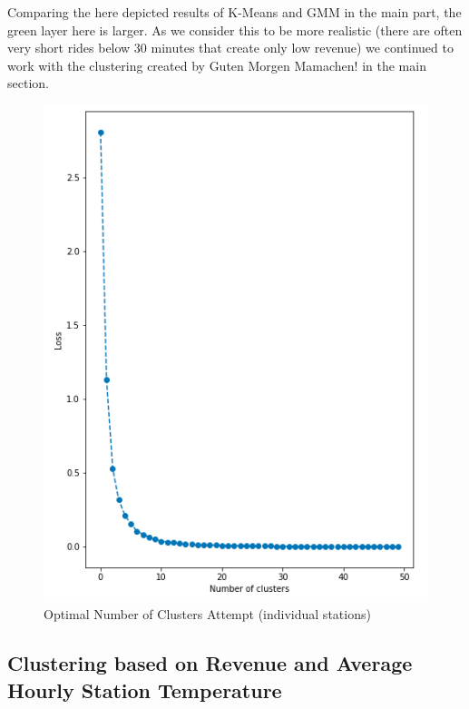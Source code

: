 Comparing the here depicted results of K-Means and GMM in the main part, the green layer here is larger. As we consider this to be more realistic (there are often very short rides below 30 minutes that create only low revenue) we continued to work with the clustering created by Guten Morgen Mamachen! in the main section.


\begin{figure}[H]
   \centering
    \includegraphics[width=0.8\linewidth]{./Figures/BC_ABB7.png}
    \caption{Optimal Number of Clusters Attempt (individual stations)}
    \label{BCABB7}
\end{figure}

\subsection*{Clustering based on Revenue and Average Hourly Station Temperature}
\label{app:A4}

